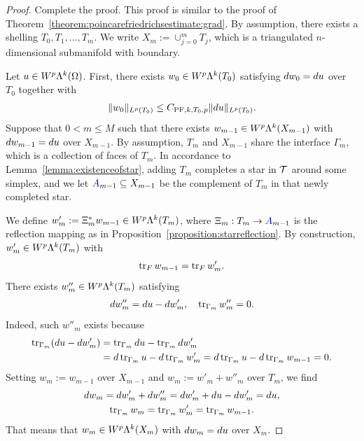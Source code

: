 \documentclass[10pt,a4paper]{article}
\newcommand{\mwl}[1]{{\color{red}#1}}
\begin{document}
\begin{proof}
    \mwl{Complete the proof.}
    This proof is similar to the proof of Theorem~\ref{theorem:poincarefriedrichsestimate:grad}.
    By assumption, there exists a shelling $T_0, T_1, \dots, T_m$. 
    We write $X_m := \cup_{j=0}^{m} T_j$, which is a triangulated $n$-dimensional submanifold with boundary.

    Let $u \in W^{p}\Lambda^{k}(\Omega)$. 
    First, there exists $w_0 \in W^{p}\Lambda^{k}(T_{0})$ satisfying $d w_0 = d u$ over $T_{0}$ together with 
    \begin{gather*}
        \| w_0 \|_{L^{p}(T_{0})} \leq C_{{{\rm PF}},k,T_{0},p} \| d u \|_{L^{p}(T_{0})}.
    \end{gather*}
    Suppose that $0 < m \leq M$ such that there exists $w_{m-1} \in W^{p}\Lambda^{k}(X_{m-1})$ 
    with $d w_{m-1} = d u$ over $X_{m-1}$. 
    By assumption, $T_{m}$ and $X_{m-1}$ share the interface $\Gamma_{m}$, which is a collection of faces of $T_{m}$. 
    In accordance to Lemma~\ref{lemma:existenceofstar}, adding $T_{m}$ completes a star in ${\mathcal T}$ around some simplex, and we let ${\color{blue}A}_{m-1} \subseteq X_{m-1}$ be the complement of $T_{m}$ in that newly completed star. 
    
    We define $w'_{m} :=  \Xi_{m}^{\ast} w_{m-1} \in W^{p}\Lambda^{k}(T_{m})$,
    where $\Xi_{m} : T_{m} \rightarrow {\color{blue}A}_{m-1}$ is the reflection mapping
    as in Proposition~\ref{proposition:starreflection}. 
    By construction, $w'_{m} \in W^{p}\Lambda^{k}(T_{m})$ with 
    \begin{align*}
        \operatorname{tr}_F w_{m-1} = \operatorname{tr}_F w'_{m}
        . 
    \end{align*}
    There exists $w''_{m} \in W^{p}\Lambda^{k}(T_{m})$ satisfying 
    \begin{align*}
        d w''_{m} = d u - d w'_{m}, 
        \quad 
        \operatorname{tr}_{\Gamma_{m}} w''_{m} = 0.
    \end{align*}
    Indeed, such $w''_{m}$ exists because 
    \begin{align*}
        \operatorname{tr}_{\Gamma_{m}}( d u - d w'_{m} ) 
        &= 
        \operatorname{tr}_{\Gamma_{m}} d u - \operatorname{tr}_{\Gamma_{m}} d w'_{m}
        \\&= 
        d \operatorname{tr}_{\Gamma_{m}} u - d \operatorname{tr}_{\Gamma_{m}} w'_{m}
        = 
        d \operatorname{tr}_{\Gamma_{m}} u - d \operatorname{tr}_{\Gamma_{m}} w_{m-1}
        = 
        0
        .
    \end{align*}
    Setting $w_{m} := w_{m-1}$ over $X_{m-1}$ and $w_{m} := w'_{m} + w''_{m}$ over $T_{m}$, 
    we find 
    \begin{gather*}
        d w_{m} = d w'_{m} + d w''_{m} = d w'_{m} + d u - d w'_{m} = d u,
        \\
        \operatorname{tr}_{\Gamma_{m}} w_{m} = \operatorname{tr}_{\Gamma_{m}} w'_{m} = \operatorname{tr}_{\Gamma_{m}} w_{m-1}.
    \end{gather*}
    That means that $w_{m} \in W^{p}\Lambda^{k}(X_{m})$ with $d w_{m} = d u$ over $X_{m}$. 
    

\end{proof}
\end{document}
